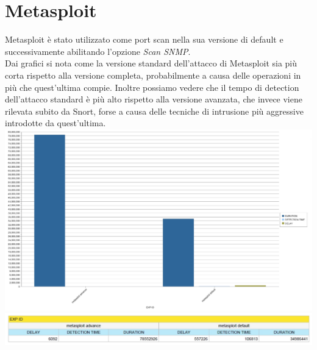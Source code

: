 \section{Metasploit}
Metasploit è stato utilizzato come port scan nella sua versione di default e successivamente abilitando l'opzione \textit{Scan SNMP}.\\
Dai grafici si nota come la versione standard dell'attacco di Metasploit sia più corta rispetto alla versione completa, probabilmente a causa delle operazioni in più che quest'ultima compie. Inoltre possiamo vedere che il tempo di detection dell'attacco standard è più alto rispetto alla versione avanzata, che invece viene rilevata subito da Snort, forse a causa delle tecniche di intrusione più aggressive introdotte da quest'ultima.\\

\includegraphics[scale=0.3]{figure/grafico_metasploit.jpg}\\

\includegraphics[scale=0.3]{figure/tempi_metasploit.jpg}

